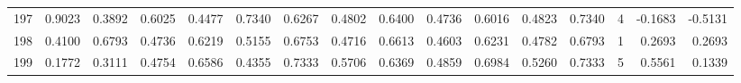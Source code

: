 \begin{tabular}{lrrrrrrrrrrrrrrr}
197 &      0.9023 &  0.3892 &  0.6025 &  0.4477 &  0.7340 &  0.6267 &  0.4802 &  0.6400 &  0.4736 &  0.6016 &   0.4823 &     0.7340 &      4 &                   -0.1683 &                    -0.5131 \\
198 &      0.4100 &  0.6793 &  0.4736 &  0.6219 &  0.5155 &  0.6753 &  0.4716 &  0.6613 &  0.4603 &  0.6231 &   0.4782 &     0.6793 &      1 &                    0.2693 &                     0.2693 \\
199 &      0.1772 &  0.3111 &  0.4754 &  0.6586 &  0.4355 &  0.7333 &  0.5706 &  0.6369 &  0.4859 &  0.6984 &   0.5260 &     0.7333 &      5 &                    0.5561 &                     0.1339 \\
\bottomrule
\end{tabular}
